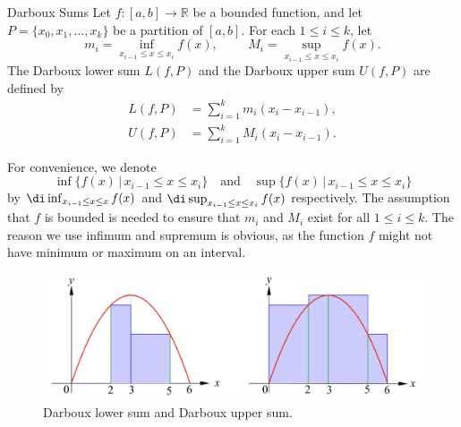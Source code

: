 \begin{definition}{Darboux Sums}
Let $f:[a,b]\to \mathbb{R}$ be a bounded function, and let $P=\{x_0, x_1, \ldots, x_k\}$ be a partition of $[a, b]$. For each $1\leq i\leq k$, let
\[m_i =\inf_{x_{i-1}\leq x\leq x_i}f(x),\hspace{1cm}
M_i =\sup_{x_{i-1}\leq x\leq x_i}f(x).\]The Darboux lower sum $L(f,P)$ and the Darboux upper sum $U(f,P)$ are defined by
\begin{align*}
L(f,P)&=\sum_{i=1}^km_i(x_i-x_{i-1}),\\
U(f,P)&=\sum_{i=1}^kM_i(x_i-x_{i-1}).
\end{align*}
\end{definition}
\begin{remark}{}
For convenience, we   denote \[ \inf \{f(x)\,|\,x_{i-1}\leq x\leq x_i\}\quad\text{and}\quad\sup\{f(x)\,|\,x_{i-1}\leq x\leq x_i\}\] by
$\di \inf_{x_{i-1}\leq x\leq x}f(x)$ and $\di \sup_{x_{i-1}\leq x\leq x_i}f(x)$ respectively. The assumption that $f$ is bounded is needed to ensure that $m_i$ and $M_i$ exist for all $1\leq i\leq k$. The reason we use infimum and supremum is obvious, as the function $f$ might not have minimum or maximum on an interval.
\end{remark}
 \begin{figure}[ht]
\centering
\includegraphics[scale=0.2]{Picture38.png}
\caption{Darboux lower sum and Darboux upper sum.\fa}\label{figure38}
\end{figure}

